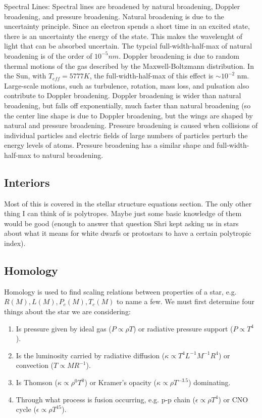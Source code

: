 Spectral Lines:
Spectral lines are broadened by natural broadening, Doppler broadening, and pressure broadening.  
Natural broadening is due to the uncertainty principle.  Since an electron spends a short time 
in an excited state, there is an uncertainty the energy of the state.  This makes the wavelenght 
of light that can be absorbed uncertain.  The typcial full-width-half-max of natural broadening is 
of the order of $10^{-5}nm$.  Doppler broadening is due to random thermal motions of the gas 
described by the Maxwell-Boltzmann distribution.  In the Sun, with $T_{eff}=5777 K$, the 
full-width-half-max of this effect is $\sim 10^{-2}$ nm.  Large-scale motions, such as turbulence, 
rotation, mass loss, and pulsation also contribute to Doppler broadening.  Doppler broadening 
is wider than natural broadening, but falls off exponentially, much faster than natural 
broadening (so the center line shape is due to Doppler broadening, but the wings are shaped by 
natural and pressure broadening.  Pressure broadening is caused when collisions of individual 
particles and electric fields of large numbers of particles perturb the energy levels of atoms.  
Pressure broadening has a similar shape and full-width-half-max to natural broadening.

\subsection{Interiors}
Most of this is covered in the stellar structure equations section.  The only other thing I can
think of is polytropes.  Maybe just some basic knowledge of them would be good (enough to 
answer that question Shri kept asking us in stars about what it means for white dwarfs or 
protostars to have a certain polytropic index).

\subsection{Homology}

Homology is used to find scaling relations between properties of a star, e.g. $R(M), L(M), P_{c}(M), T_{c}(M)$ to name a few.  We must first determine four things about the star we are considering:

\begin{enumerate}
	\item Is pressure given by ideal gas ($P \propto \rho T$) or radiative pressure support ($P \propto T^{4}$).
	\item Is the luminosity carried by radiative diffusion ($\kappa \propto T^{4} L^{-1} M^{-1} R^{4}$) or convection ($T \propto M R^{-1}$).
	\item Is Thomson ($\kappa \propto \rho^{0} T^{0}$) or Kramer's opacity ($\kappa \propto \rho T^{-3.5}$) dominating.
	\item Through what process is fusion occurring, e.g. p-p chain ($\epsilon \propto \rho T^{4}$) or CNO cycle ($\epsilon \propto \rho T^{15}$).
\end{enumerate}

